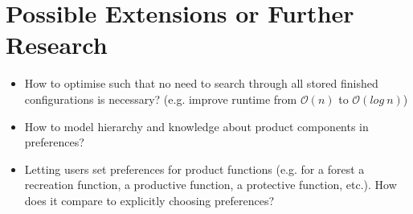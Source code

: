 \section{Possible Extensions or Further Research}

\begin{itemize}
    \item How to optimise such that no need to search through all stored finished configurations is necessary? (e.g. improve runtime from $\mathcal{O}(n)$ to $\mathcal{O}(log\ n)$)
    \item How to model hierarchy and knowledge about product components in preferences?
    \item Letting users set preferences for product functions (e.g. for a forest a recreation function, a productive function, a protective function, etc.). How does it compare to explicitly choosing preferences?
\end{itemize}
